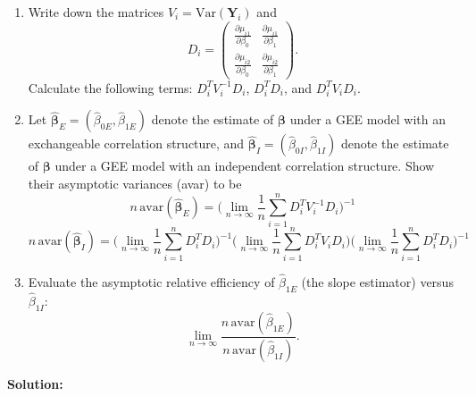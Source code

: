 \begin{enumerate}[label=(\alph*)]
  \item Write down the matrices $V_i = \text{Var}(\boldsymbol{Y}_i)$ and
  \[
    D_i = \begin{pmatrix} \frac{\partial \mu_{i1}}{\partial \beta_0} & \frac{\partial \mu_{i1}}{\partial \beta_1} \\[4pt] \frac{\partial \mu_{i2}}{\partial \beta_0} & \frac{\partial \mu_{i2}}{\partial \beta_1} \end{pmatrix}.
  \]
  Calculate the following terms: $D_i^T V_i^{-1} D_i$, $D_i^T D_i$, and $D_i^T V_i D_i$.

  \item Let $\widehat{\boldsymbol{\beta}}_E = (\widehat{\beta}_{0E}, \widehat{\beta}_{1E})$ denote the estimate of $\boldsymbol{\beta}$ under a GEE model with an exchangeable correlation structure, and $\widehat{\boldsymbol{\beta}}_I = (\widehat{\beta}_{0I}, \widehat{\beta}_{1I})$ denote the estimate of $\boldsymbol{\beta}$ under a GEE model with an independent correlation structure. Show their asymptotic variances (avar) to be
  \[
    n\,\text{avar}(\widehat{\boldsymbol{\beta}}_E) = \bigg(\lim_{n\to\infty} \frac{1}{n}\sum_{i=1}^n D_i^T V_i^{-1} D_i\bigg)^{-1}
  \]
  \[
    n\,\text{avar}(\widehat{\boldsymbol{\beta}}_I) = \bigg(\lim_{n\to\infty}\frac{1}{n}\sum_{i=1}^n D_i^T D_i\bigg)^{-1} \bigg(\lim_{n\to\infty}\frac{1}{n}\sum_{i=1}^n D_i^T V_i D_i\bigg) \bigg(\lim_{n\to\infty}\frac{1}{n}\sum_{i=1}^n D_i^T D_i\bigg)^{-1}
  \]

  \item Evaluate the asymptotic relative efficiency of $\widehat{\beta}_{1E}$ (the slope estimator) versus $\widehat{\beta}_{1I}$:
  \[
    \lim_{n\to\infty} \frac{n\,\text{avar}(\widehat{\beta}_{1E})}{n\,\text{avar}(\widehat{\beta}_{1I})}.
  \]
\end{enumerate}

\bigskip
\textbf{Solution:}

